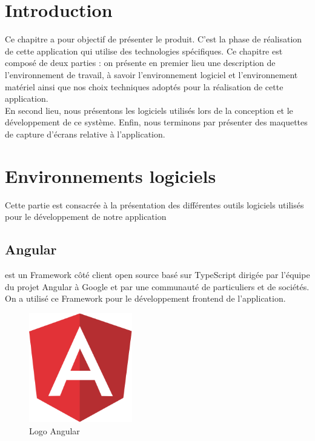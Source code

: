 \documentclass[a4paper,10pt]{book}
\begin{document}
\section{Introduction}
\par  
   Ce chapitre a pour objectif de présenter le produit. C’est la phase de réalisation de cette application qui utilise des technologies spécifiques. Ce chapitre est composé de deux parties : on présente en premier lieu une description de l’environnement de travail, à savoir l’environnement logiciel et l’environnement matériel ainsi que nos choix techniques adoptés pour la réalisation de cette application.  
\\
   En second lieu, nous présentons les logiciels utilisés lors de la conception et le développement de ce système. Enfin, nous terminons par présenter des maquettes de capture d’écrans relative à l’application. 

\section{Environnements logiciels}

Cette partie est consacrée à la présentation des différentes outils logiciels utilisés pour le développement de notre application

\subsection{  Angular}
est un Framework côté client \cite{angular} open source basé sur TypeScript dirigée par l'équipe du projet Angular à Google et par une communauté de particuliers et de sociétés. On a utilisé ce Framework pour le développement frontend de l’application.
\begin{figure}[!h]
\centering 
\includegraphics[width=0.4\textwidth]{d.png}
\caption{Logo Angular }
\end{figure}
\end{document}
